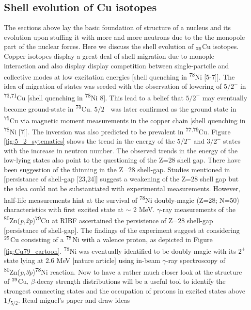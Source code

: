 \subsection{Shell evolution of Cu isotopes}


The sections above lay the basic foundation of structure of a nucleus and its evolution upon stuffing it with more and more neutrons due to the the monopole part of the nuclear forces. Here we discuss the shell evolution of $\textsubscript{29}$Cu isotopes. Copper isotopes display a great deal of shell-migration due to monople interaction and also display display competition between single-partcile and collective modes at low excitation energies [shell quenching in \textsuperscript{78}Ni [5-7]]. The idea of migration of states was seeded with the observation of lowering of $5/2^{-}$ in \textsuperscript{73,71}Cu [shell quenching in \textsuperscript{78}Ni 8]. This lead to a belief that $5/2^{-}$ may eventually become ground-state in \textsuperscript{75}Cu. $5/2^{-}$ was later confirmed as the ground state in \textsuperscript{75}Cu via magnetic moment measurements in the copper chain [shell quenching in \textsuperscript{78}Ni [7]]. The inversion was also predicted to be prevalent in  \textsuperscript{77,79}Cu. Figure \ref{fig:5_2_sytematics} shows the trend in the energy of the $5/2^{-}$ and $3/2^{-}$ states with the increase in neutron number. The observed trends in the energy of the low-lying states also point to the questioning of the Z=28 shell gap. There have been suggestion of the thinning in the Z=28 shell-gap. Studies mentioned in [persistance of shell-gap [23,24]] suggest a weakening of the Z=28 shell gap but the idea could not be substantiated with experimental measurements. However, half-life measurements hint at the survival of \textsuperscript{78}Ni doubly-magic (Z=28; N=50) characteristics with first excited state at $\sim$ 2 MeV. $\gamma$-ray measurements of the \textsuperscript{80}Zn(\textit{p,2p})\textsuperscript{79}Cu at RIBF ascertained the persistence of Z=28 shell-gap [persistance of shell-gap]. The findings of the experiment suggest at considering $\textsuperscript{29}$Cu consisting of a $\textsuperscript{78}$Ni with a valence proton, as depicted in Figure \ref{fig:Cu79_cartoon}. \textsuperscript{78}Ni was eventually identified to be doubly-magic with its $2^{+}$ state lying at 2.6 MeV [nature article] using in-beam $\gamma$-ray spectroscopy of \textsuperscript{80}Zn(\textit{p,3p})\textsuperscript{78}Ni reaction. Now to have a rather much closer look at the structure of $\textsuperscript{29}$Cu, $\beta$-decay strength distributions will be a useful tool to identify the strongest connecting states and the occupation of protons in excited states above $1f_{5/2}$. Read miguel's paper and draw ideas 


